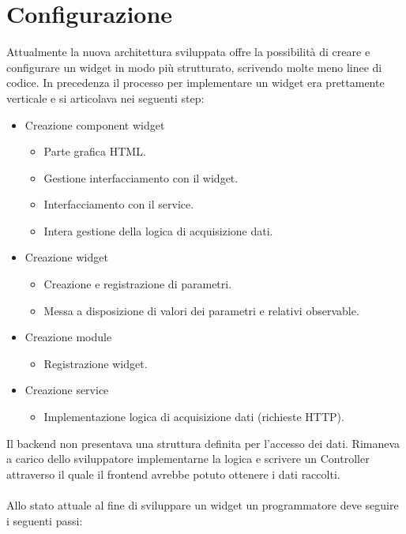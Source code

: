 \FloatBarrier
\pagebreak
\section{Configurazione}
Attualmente la nuova architettura sviluppata offre la possibilità di creare e configurare un widget in modo più strutturato, scrivendo molte meno linee di codice.
In precedenza il processo per implementare un widget era prettamente verticale e si articolava nei seguenti step:
\begin{itemize}
\item
Creazione component widget
\begin{itemize}
\item
Parte grafica HTML.
\item
Gestione interfacciamento con il widget.
\item
Interfacciamento con il service.
\item
Intera gestione della logica di acquisizione dati.
\end{itemize}
\item
Creazione widget
\begin{itemize}
\item
Creazione e registrazione di parametri.
\item
Messa a disposizione di valori dei parametri e relativi observable.
\end{itemize}
\item
Creazione module
\begin{itemize}
\item
Registrazione widget.
\end{itemize}
\item
Creazione service
\begin{itemize}
\item
Implementazione logica di acquisizione dati (richieste HTTP).
\end{itemize}
\end{itemize}
Il backend non presentava una struttura definita per l'accesso dei dati. Rimaneva a carico dello sviluppatore implementarne la logica e scrivere un Controller attraverso il quale il frontend avrebbe potuto ottenere i dati raccolti.\\\\
Allo stato attuale al fine di sviluppare un widget un programmatore deve seguire i seguenti passi:
